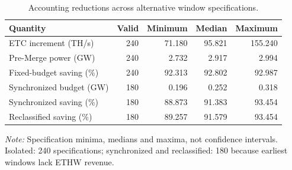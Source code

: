 \begin{table}[htbp]
\centering
\small
\caption{Accounting reductions across alternative window specifications.}
\label{uqadd:tabwindows}
\begin{tabular}{lrrrr}
\toprule
Quantity & Valid & Minimum & Median & Maximum \\
\midrule
ETC increment (TH/s) & 240 & 71.180 & 95.821 & 155.240 \\
Pre-Merge power (GW) & 240 & 2.732 & 2.917 & 2.994 \\
Fixed-budget saving (\%) & 240 & 92.313 & 92.802 & 92.987 \\
Synchronized budget (GW) & 180 & 0.196 & 0.252 & 0.318 \\
Synchronized saving (\%) & 180 & 88.873 & 91.383 & 93.454 \\
Reclassified saving (\%) & 180 & 89.257 & 91.579 & 93.454 \\
\bottomrule
\end{tabular}
\par\smallskip
\begin{minipage}{\linewidth}
\footnotesize
\textit{Note:} Specification minima, medians and maxima, not confidence intervals. Isolated: 240 specifications; synchronized and reclassified: 180 because earliest windows lack ETHW revenue.
\end{minipage}
\end{table}
